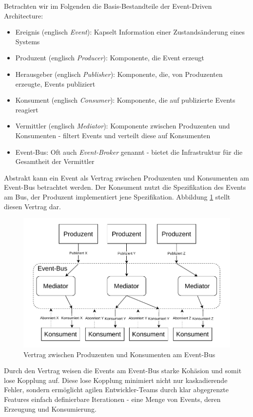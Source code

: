 \documentclass[acmtog]{acmart}
\begin{document}
Betrachten wir im Folgenden die Basis-Bestandteile der Event-Driven Architecture:
\begin{itemize}
  \item Ereignis (englisch \textit{Event}): Kapselt Information einer Zustandsänderung eines Systems
  \item Produzent (englisch \textit{Producer}): Komponente, die Event erzeugt
  \item Herausgeber (englisch \textit{Publisher}): Komponente, die, von Produzenten erzeugte, Events publiziert
  \item Konsument (englisch \textit{Consumer}): Komponente, die auf publizierte Events reagiert
  \item Vermittler (englisch \textit{Mediator}): Komponente zwischen Produzenten und Konsumenten - filtert Events und verteilt diese auf Konsumenten
  \item Event-Bus: Oft auch \textit{Event-Broker} genannt - bietet die Infrastruktur für die Gesamtheit der Vermittler
\end{itemize}
Abstrakt kann ein Event als Vertrag zwischen Produzenten und Konsumenten am Event-Bus betrachtet werden.
Der Konsument nutzt die Spezifikation des Events am Bus, der Produzent implementiert jene Spezifikation.
Abbildung \ref{fig:eda} stellt diesen Vertrag dar.

\begin{figure}[!h]
  \centering
  \includegraphics[width=\linewidth]{images/eda/eda.drawio}
  \caption{Vertrag zwischen Produzenten und Konsumenten am Event-Bus}
  \label{fig:eda}
\end{figure}

Durch den Vertrag weisen die Events am Event-Bus starke Kohäsion und somit lose Kopplung auf.
Diese lose Kopplung minimiert nicht nur kaskadierende Fehler, sondern ermöglicht agilen Entwickler-Teams durch klar abgegrenzte Features einfach definierbare Iterationen
- eine Menge von Events, deren Erzeugung und Konsumierung.
\end{document}

